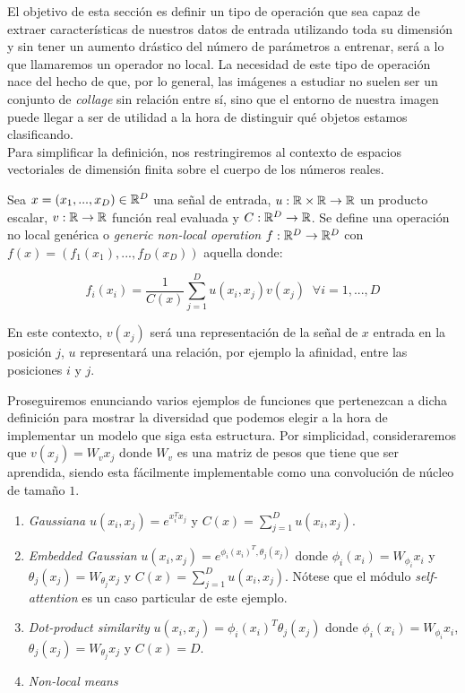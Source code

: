 El objetivo de esta sección es definir un tipo de operación que sea capaz de extraer características de nuestros datos de entrada utilizando toda su dimensión y sin tener un aumento drástico del número de parámetros a entrenar, será a lo que llamaremos un operador no local. La necesidad de este tipo de operación nace del hecho de que, por lo general, las imágenes a estudiar no suelen ser un conjunto de \emph{collage} sin relación entre sí, sino que el entorno de nuestra imagen puede llegar a ser de utilidad a la hora de distinguir qué objetos estamos clasificando.\\

Para simplificar la definición, nos restringiremos al contexto de espacios vectoriales de dimensión finita sobre el cuerpo de los números reales.
\begin{definicion}
 Sea $x=(x_1,...,x_D)\in \mathbb{R}^D$ una señal de entrada, $u:\mathbb{R} \times \mathbb{R} \to \mathbb{R}$ un producto escalar, $v:\mathbb{R} \to \mathbb{R}$ función real evaluada y $C:\mathbb{R}^D \to \mathbb{R}$.  Se define una operación no local genérica o \emph{generic non-local operation} $f:\mathbb{R}^D \to \mathbb{R}^D$ con $f(x)=(f_1(x_1),...,f_D(x_D))$ aquella donde:

 $$f_i(x_i)=\frac{1}{C(x)}\sum_{j=1}^{D} u(x_i,x_j)v(x_j) \; \;  \forall i=1,...,D$$
\end{definicion}

 En este contexto, $v(x_j)$ será una representación de la señal de $x$ entrada en la posición $j$, $u$ representará una relación, por ejemplo la afinidad, entre las posiciones $i$ y $j$. %
\newline

 Proseguiremos enunciando varios ejemplos de funciones que pertenezcan a dicha definición para mostrar la diversidad que podemos elegir a la hora de implementar un modelo que siga esta estructura. Por simplicidad, consideraremos que $v(x_j)=W_v x_j$ donde $W_v$ es una matriz de pesos que tiene que ser aprendida, siendo esta fácilmente implementable como una convolución de núcleo de tamaño $1$.

 \begin{enumerate}
 \item \emph{Gaussiana} $u(x_i,x_j)=e^{x_i^T x_j}$ y $C(x)= \sum_{j=1}^D u(x_i,x_j)$.
 \item \emph{Embedded Gaussian} $u(x_i,x_j)=e^{\phi_i(x_i)^T,\theta_j(x_j)}$ donde $\phi_i(x_i)=W_{\phi_i} x_i$ y $\theta_j(x_j)=W_{\theta_j} x_j$ y  $C(x)= \sum_{j=1}^D u(x_i,x_j)$. Nótese que el módulo \emph{self-attention} \cite{DBLP:journals/corr/VaswaniSPUJGKP17} es un caso particular de este ejemplo.
 \item \emph{Dot-product similarity} $u(x_i,x_j)=\phi_i(x_i)^T \theta_j(x_j)$ donde $\phi_i(x_i)=W_{\phi_i} x_i$, $\theta_j(x_j)=W_{\theta_j} x_j$ y $C(x)=D$.
 \item \emph{Non-local means} \cite{Buades:2005:NAI:1068508.1069066}
 \end{enumerate}

